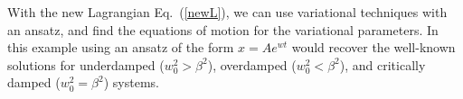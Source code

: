 With the new Lagrangian Eq.~(\ref{newL}), we can use variational techniques with an ansatz, and find the equations of motion for the variational parameters.  In this example using an ansatz of the form $x = Ae^{wt}$ would recover the well-known solutions for underdamped ($w_0^2 > \beta^2$), overdamped ($w_0^2 < \beta^2$), and critically damped ($w_0^2 = \beta^2$) systems. 

% 

 


